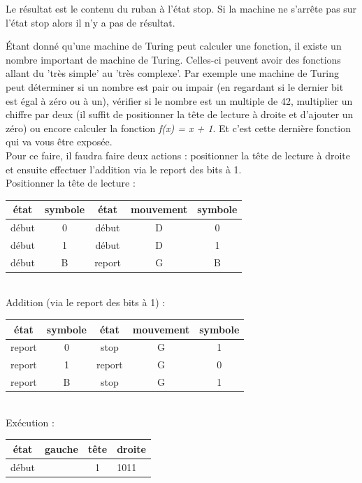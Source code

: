  Le résultat est le contenu du ruban à l'état stop. Si la machine
ne s'arrête pas sur l'état stop alors il n'y a pas de résultat.

\begin{myexem}
Étant donné qu'une machine de Turing peut calculer une fonction, il existe un nombre important de machine de Turing. Celles-ci peuvent avoir des fonctions allant du 'très simple' au 'très complexe'. Par exemple une machine de Turing peut déterminer si un nombre est pair ou impair (en regardant si le dernier bit est égal à zéro ou à un), vérifier si le nombre est un multiple de 42, multiplier un chiffre par deux (il suffit de positionner la tête de lecture à droite et d'ajouter un zéro) ou encore calculer la fonction \textit{f(x) = x + 1}. Et c'est cette dernière fonction qui va vous être exposée.\\
Pour ce faire, il faudra faire deux actions : positionner la tête de lecture à droite et ensuite effectuer l'addition via le report des bits à 1.
\vspace{4pt} \\
Positionner la tête de lecture : \\
\begin{tabular}{|c|c|c|c|c|}
\hline
 état & symbole & état & mouvement & symbole \\\hline
 début & 0 & début & D & 0 \\ \hline
 début & 1 & début & D & 1 \\ \hline
 début & B & report & G & B \\ \hline
\end{tabular}
\vspace{4pt}
\\
Addition (via le report des bits à 1) : \\
\begin{tabular}{|c|c|c|c|c|}
\hline
 état & symbole & état & mouvement & symbole \\\hline
 report & 0 & stop & G & 1 \\ \hline
 report & 1 & report & G & 0 \\ \hline
 report & B & stop & G & 1 \\ \hline
\end{tabular}
\vspace{4pt}
\\
Exécution : \\
\begin{tabular}{|c|r|c|l|}
\hline
 état & gauche & tête & droite \\\hline
 début &  & 1 & 1011 \\ \hline

\end{tabular}
\end{myexem}

